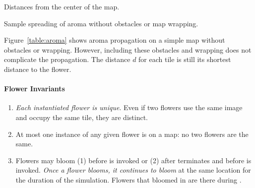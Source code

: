 \documentclass{pset}
\begin{document}
\begin{table}[H]
  \centering
  \caption{Distances from the center of the map.}
  \label{table:manhattan}
\end{table}

\begin{table}[H]
  \centering
  \caption{Sample spreading of aroma without obstacles or map wrapping.}
  \label{table:aroma}
\end{table}

Figure~\ref{table:aroma} shows aroma propagation on a simple map without
obstacles or wrapping. However, including these obstacles and wrapping does not
complicate the propagation. The distance $d$ for each tile is still its
shortest distance to the flower. 

\paragraph{Flower Invariants}
\begin{enumerate}
    \item \emph{Each instantiated flower is unique}. Even if two flowers use
        the same image and occupy the same tile, they are distinct. 
    \item At most one instance of any given flower is on a map: no two flowers
        are the same.
    \item Flowers may bloom (1) before  is invoked or (2) after
         terminates and before  is invoked. \emph{Once a
        flower blooms, it continues to bloom} at the same location for the
        duration of the simulation. Flowers that bloomed in  are
        there during .
\end{enumerate}
\end{document}

